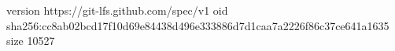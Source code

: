 version https://git-lfs.github.com/spec/v1
oid sha256:cc8ab02bcd17f10d69e84438d496e333886d7d1caa7a2226f86c37ce641a1635
size 10527
